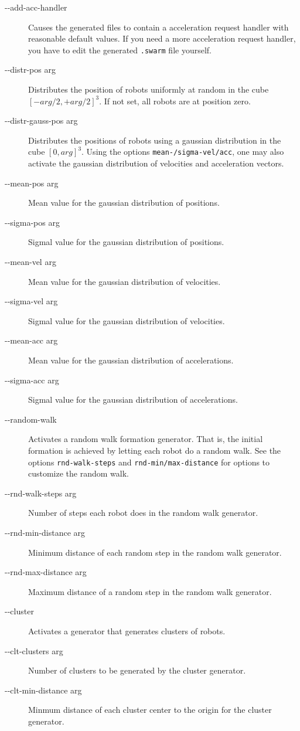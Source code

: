 \begin{description}
	\item [-{}-add-acc-handler] Causes the generated files to contain a acceleration request handler with reasonable default values. If you need a more acceleration request handler, you have to edit the generated {\tt .swarm} file yourself.
	\item [-{}-distr-pos arg] Distributes the position of robots uniformly at random in the cube $[-arg/2,+arg/2]^3$.
 If not set, all robots are at position zero.
 	\item [-{}-distr-gauss-pos arg] Distributes the positions of robots using a gaussian distribution in the cube $[0,arg]^3$. Using the options \texttt{mean-/sigma-vel/acc}, one may also activate the gaussian distribution of velocities and acceleration vectors.
 	\item [-{}-mean-pos arg] Mean value for the gaussian distribution of positions.
	\item [-{}-sigma-pos arg] Sigmal value for the gaussian distribution of positions.
 	\item [-{}-mean-vel arg] Mean value for the gaussian distribution of velocities.
	\item [-{}-sigma-vel arg] Sigmal value for the gaussian distribution of velocities.
 	\item [-{}-mean-acc arg] Mean value for the gaussian distribution of accelerations.
	\item [-{}-sigma-acc arg] Sigmal value for the gaussian distribution of accelerations.
	\item [-{}-random-walk] Activates a random walk formation generator. That is, the initial formation is achieved by letting each robot do a random walk. See the options \texttt{rnd-walk-steps} and \texttt{rnd-min/max-distance} for options to customize the random walk.
	\item [-{}-rnd-walk-steps arg] Number of steps each robot does in the random walk generator.
	\item [-{}-rnd-min-distance arg] Minimum distance of each random step in the random walk generator.
	\item [-{}-rnd-max-distance arg] Maximum distance of a random step in the random walk generator.
	\item [-{}-cluster] Activates a generator that generates clusters of robots.
	\item [-{}-clt-clusters arg] Number of clusters to be generated by the cluster generator.
	\item [-{}-clt-min-distance arg] Minmum distance of each cluster center to the origin for the cluster generator.

\end{description}
